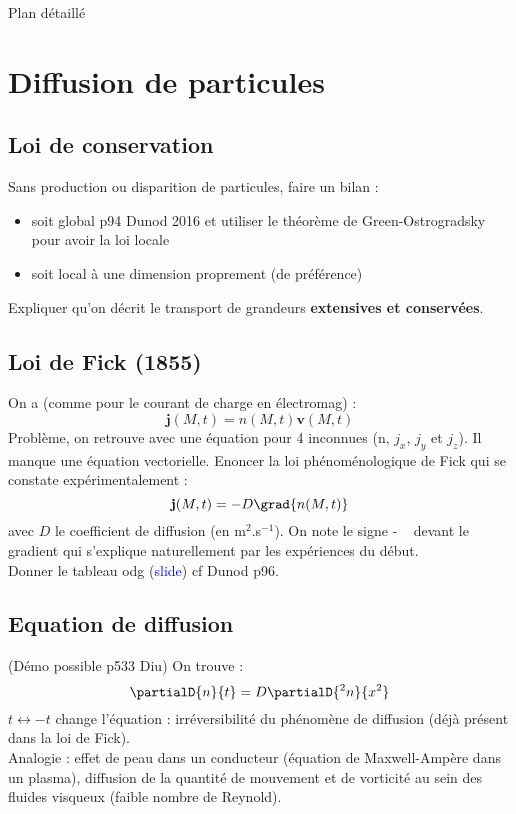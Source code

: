 \begin{reportBlock}{Plan détaillé}
\section{Diffusion de particules}

\subsection{Loi de conservation}
Sans production ou disparition de particules, faire un bilan :
\begin{itemize}
    \item soit global p94 Dunod 2016 et utiliser le théorème de Green-Ostrogradsky pour avoir la loi locale
    \item soit local à une dimension proprement (de préférence)
\end{itemize}
Expliquer qu'on décrit le transport de grandeurs \textbf{extensives et conservées}.

\subsection{Loi de Fick (1855)}
On a (comme pour le courant de charge en électromag) :
\begin{equation}
    \mathbf{j}(M,t) = n(M,t)\mathbf{v}(M,t)
\end{equation}
Problème, on retrouve avec une équation pour 4 inconnues (n, $j_x$, $j_y$ et $j_z$). Il manque une équation vectorielle. Enoncer la loi phénoménologique de Fick qui se constate expérimentalement :
\begin{equation}
    \mathbf{j}(M,t) = -D\grad{n(M,t)}
\end{equation}
avec $D$ le coefficient de diffusion (en m$^2$.s$^{-1}$). On note le signe \og - \fg~ devant le gradient qui s'explique naturellement par les expériences du début.\\

Donner le tableau odg (\textcolor{blue}{slide}) cf Dunod p96.\\


\subsection{Equation de diffusion}
(Démo possible p533 Diu)
On trouve : 
\begin{equation}
    \partialD{n}{t} = D\partialD{^2n}{x^2}
\end{equation}
$t\longleftrightarrow -t$ change l'équation : irréversibilité du phénomène de diffusion (déjà présent dans la loi de Fick).\\
Analogie : effet de peau dans un conducteur (équation de Maxwell-Ampère dans un plasma), diffusion de la quantité de mouvement et de vorticité au sein des fluides visqueux (faible nombre de Reynold).


\end{reportBlock}
